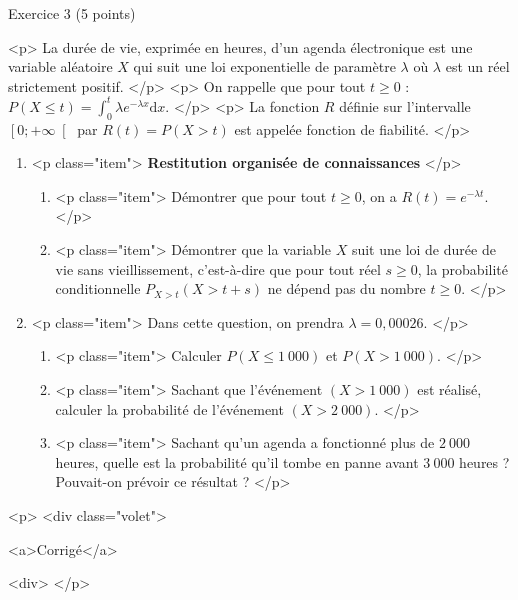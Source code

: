 
\begin{h2}Exercice 3 (5 points)\end{h2}
<p>
La durée de vie, exprimée en heures, d'un agenda électronique est une variable aléatoire $X$ qui suit une loi exponentielle de paramètre $\lambda $ où $\lambda $ est un réel strictement positif.
</p>
<p>
On rappelle que pour tout $t \geqslant 0$ : $P\left(X \leqslant t\right)= \int_{0}^{t} \lambda  e^{-\lambda  x} \text{d}x$.
</p>
<p>
La fonction $R$ définie sur l'intervalle $\left[0 ; +\infty \right[$ par $R\left(t\right)=P\left(X > t\right)$ est appelée fonction de fiabilité.
</p>
\begin{enumerate}
     \item <p class="item"> \textbf{Restitution organisée de connaissances}
     </p>
     \begin{enumerate}
          \item <p class="item"> Démontrer que pour tout $t \geqslant 0$, on a $R\left(t\right)=e^{-\lambda  t}$.
          </p>
          \item <p class="item"> Démontrer que la variable  $X$ suit une loi de durée de vie sans vieillissement, c'est-à-dire que pour tout réel $s \geqslant 0$, la probabilité conditionnelle $P_{X > t}\left(X > t+s\right)$ ne dépend pas du nombre $t \geqslant 0$.
          </p>
     \end{enumerate}
     \item <p class="item"> Dans cette question, on prendra $\lambda =0,00026$.
     </p>
     \begin{enumerate}
          \item <p class="item"> Calculer $P\left(X \leqslant 1~000\right)$ et $P\left(X > 1~000\right)$.
          </p>
          \item <p class="item"> Sachant que l'événement $\left(X > 1~000\right)$ est réalisé, calculer la probabilité de l'événement $\left(X > 2~000\right)$.
          </p>
          \item <p class="item"> Sachant qu'un agenda a fonctionné plus de $2~000$ heures, quelle est la probabilité qu'il tombe en panne avant $3~000$ heures ? Pouvait-on prévoir ce résultat ?
          </p>
     \end{enumerate}
\end{enumerate}
<p>
<div class="volet">\begin{h2}<a>Corrigé</a>\end{h2}<div>
</p>
